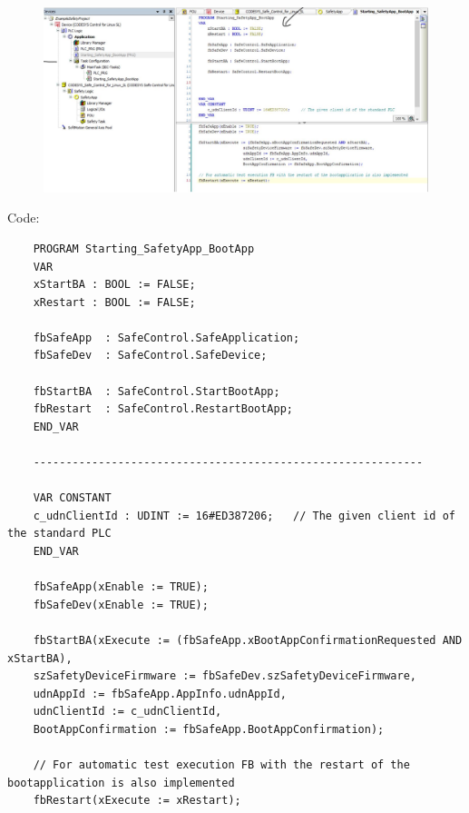 \documentclass[a4paper,12pt]{article}
\begin{document}
\begin{figure}[H]
	\centering
	\includegraphics[width=1\textwidth]{e24.JPG}
\end{figure}
Code:
\begin{verbatim}
	PROGRAM Starting_SafetyApp_BootApp
	VAR
	xStartBA : BOOL := FALSE;
	xRestart : BOOL := FALSE;
	
	fbSafeApp  : SafeControl.SafeApplication;
	fbSafeDev  : SafeControl.SafeDevice;
	
	fbStartBA  : SafeControl.StartBootApp;
	fbRestart  : SafeControl.RestartBootApp;
	END_VAR
	
	------------------------------------------------------------
	
	VAR CONSTANT
	c_udnClientId : UDINT := 16#ED387206;   // The given client id of the standard PLC
	END_VAR
	
	fbSafeApp(xEnable := TRUE);
	fbSafeDev(xEnable := TRUE);
	
	fbStartBA(xExecute := (fbSafeApp.xBootAppConfirmationRequested AND xStartBA),
	szSafetyDeviceFirmware := fbSafeDev.szSafetyDeviceFirmware,
	udnAppId := fbSafeApp.AppInfo.udnAppId,
	udnClientId := c_udnClientId,
	BootAppConfirmation := fbSafeApp.BootAppConfirmation);
	
	// For automatic test execution FB with the restart of the bootapplication is also implemented
	fbRestart(xExecute := xRestart);
\end{verbatim}
\end{document}
